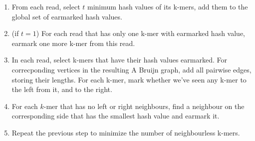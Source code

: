 \documentclass[12pt]{article}
\begin{document}
\begin{enumerate}
\item From each read, select $t$ minimum hash values of its k-mers, add them to the global set of earmarked hash values.
\item (if $t=1$) For each read that has only one k-mer with earmarked hash value, earmark one more k-mer from this read.
\item In each read, select k-mers that have their hash values earmarked.
For correcponding vertices in the resulting A Bruijn graph, add all pairwise edges, storing their lengths.
For each k-mer, mark whether we've seen any k-mer to the left from it, and to the right.
\item For each $k$-mer that has no left or right neighbours, find a neighbour on the corresponding side
that has the smallest hash value and earmark it.
\item Repeat the previous step to minimize the number of neighbourless k-mers.
\end{enumerate}
\end{document}
